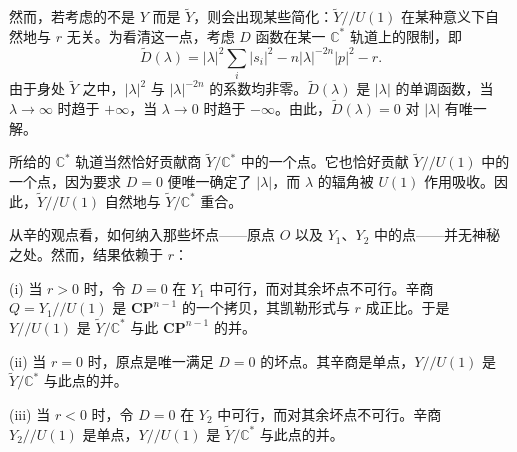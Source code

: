 
然而，若考虑的不是 $Y$ 而是 $\tilde{Y}$，则会出现某些简化：$\tilde{Y}//U(1)$ 在某种意义下自然地与 $r$ 无关。为看清这一点，考虑 $D$ 函数在某一 $\mathbb{C}^*$ 轨道上的限制，即
\begin{equation}
\tilde{D}(\lambda)=|\lambda|^2\sum_i|s_i|^2-n|\lambda|^{-2n}|p|^2-r.
\tag{4.3}
\end{equation}
由于身处 $\tilde{Y}$ 之中，$|\lambda|^2$ 与 $|\lambda|^{-2n}$ 的系数均非零。$\tilde{D}(\lambda)$ 是 $|\lambda|$ 的单调函数，当 $\lambda\to\infty$ 时趋于 $+\infty$，当 $\lambda\to0$ 时趋于 $-\infty$。由此，$\tilde{D}(\lambda)=0$ 对 $|\lambda|$ 有唯一解。


所给的 $\mathbb{C}^*$ 轨道当然恰好贡献商 $\tilde{Y}/\mathbb{C}^*$ 中的一个点。它也恰好贡献 $\tilde{Y}//U(1)$ 中的一个点，因为要求 $D=0$ 便唯一确定了 $|\lambda|$，而 $\lambda$ 的辐角被 $U(1)$ 作用吸收。因此，$\tilde{Y}//U(1)$ 自然地与 $\tilde{Y}/\mathbb{C}^*$ 重合。

从辛的观点看，如何纳入那些坏点——原点 $O$ 以及 $Y_1$、$Y_2$ 中的点——并无神秘之处。然而，结果依赖于 $r$：

(i) 当 $r>0$ 时，令 $D=0$ 在 $Y_1$ 中可行，而对其余坏点不可行。辛商 $Q=Y_1//U(1)$ 是 $\mathbf{CP}^{n-1}$ 的一个拷贝，其凯勒形式与 $r$ 成正比。于是 $Y//U(1)$ 是 $\tilde{Y}/\mathbb{C}^*$ 与此 $\mathbf{CP}^{n-1}$ 的并。

\label{op:47}
(ii) 当 $r=0$ 时，原点是唯一满足 $D=0$ 的坏点。其辛商是单点，$Y//U(1)$ 是 $\tilde{Y}/\mathbb{C}^*$ 与此点的并。

(iii) 当 $r<0$ 时，令 $D=0$ 在 $Y_2$ 中可行，而对其余坏点不可行。辛商 $Y_2//U(1)$ 是单点，$Y//U(1)$ 是 $\tilde{Y}/\mathbb{C}^*$ 与此点的并。

